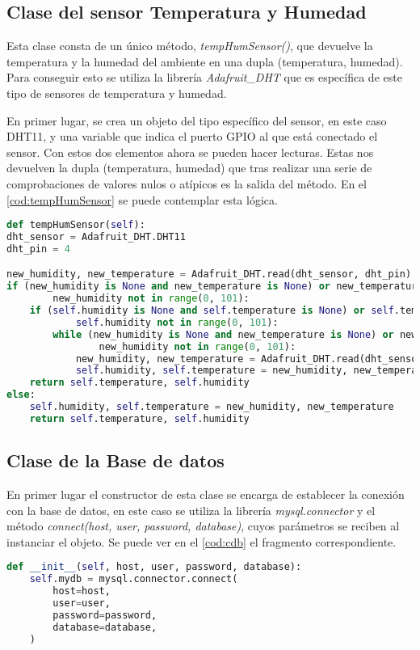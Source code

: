 \subsection{Clase del sensor Temperatura y Humedad}
Esta clase consta de un único método, \textit{tempHumSensor()}, que devuelve la temperatura y la humedad del ambiente en una dupla (temperatura, humedad). Para conseguir esto se utiliza la librería \textit{Adafruit\_DHT} \cite{noauthor_dht_nodate} que es específica de este tipo de sensores de temperatura y humedad.

En primer lugar, se crea un objeto del tipo específico del sensor, en este caso DHT11, y una variable que indica el puerto GPIO al que está conectado el sensor. Con estos dos elementos ahora se pueden hacer lecturas. Estas nos devuelven la dupla (temperatura, humedad) que tras realizar una serie de comprobaciones de valores nulos o atípicos es la salida del método. En el \autoref{cod:tempHumSensor} se puede contemplar esta lógica.
\begin{lstlisting}[language=Python, label=cod:tempHumSensor, caption=Lectura de la temperatura y humedad]
def tempHumSensor(self):
dht_sensor = Adafruit_DHT.DHT11
dht_pin = 4

new_humidity, new_temperature = Adafruit_DHT.read(dht_sensor, dht_pin)
if (new_humidity is None and new_temperature is None) or new_temperature not in range(0, 101) or \
        new_humidity not in range(0, 101):
    if (self.humidity is None and self.temperature is None) or self.temperature not in range(0, 101) or \
            self.humidity not in range(0, 101):
        while (new_humidity is None and new_temperature is None) or new_temperature not in range(0, 101) or \
                new_humidity not in range(0, 101):
            new_humidity, new_temperature = Adafruit_DHT.read(dht_sensor, dht_pin)
            self.humidity, self.temperature = new_humidity, new_temperature
    return self.temperature, self.humidity
else:
    self.humidity, self.temperature = new_humidity, new_temperature
    return self.temperature, self.humidity  
\end{lstlisting}

\subsection{Clase de la Base de datos}
En primer lugar el constructor de esta clase se encarga de establecer la conexión con la base de datos, en este caso se utiliza la librería \textit{mysql.connector} y el método \textit{connect(host, user, password, database)}, cuyos parámetros se reciben al instanciar el objeto. Se puede ver en el \autoref{cod:cdb} el fragmento correspondiente.
\begin{lstlisting}[language=Python, label=cod:cdb, caption=Conexión con la base de datos]
def __init__(self, host, user, password, database):
    self.mydb = mysql.connector.connect(
        host=host,
        user=user,
        password=password,
        database=database,
    )
\end{lstlisting}

